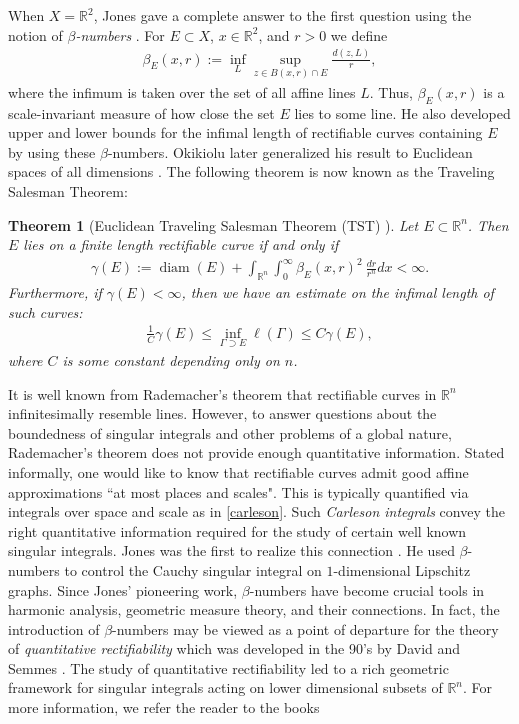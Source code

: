 \documentclass[11pt]{amsart}
\newtheorem{theorem}{Theorem}
\def\diam{{\rm diam\,}}
\theoremstyle{definition}
\newcommand{\R}{\mathbb R}
\def\diam{\operatorname{diam}}
\numberwithin{theorem}{section} \numberwithin{equation}{section}
\begin{document}
When $X = \R^2$, Jones gave a complete answer to the first question using the notion of {\em $\beta$-numbers} \cite{JonesTSP}.  For $E \subset X$,  $x \in \R^2$, and $r > 0$ we define
\begin{align*}
  \beta_E(x,r) := \inf_L \sup_{z \in B(x,r) \cap E} \frac{d(z,L)}{r},
\end{align*}
where the infimum is taken over the set of all affine lines $L$.  Thus, $\beta_E(x,r)$ is a scale-invariant measure of how close the set $E$ lies to some line.  He also developed upper and lower bounds for the infimal length of rectifiable curves containing $E$ by using these $\beta$-numbers.  Okikiolu later generalized his result to Euclidean spaces of all dimensions \cite{Okikiolu}.  The following theorem is now known as the Traveling Salesman Theorem:
\begin{theorem}[Euclidean Traveling Salesman Theorem (TST) \cite{JonesTSP,Okikiolu}]
\label{etst}
  Let $E \subset \R^n$.  Then $E$ lies on a finite length rectifiable curve if and only if %
  \begin{align} \label{carleson}
    \gamma(E) := \diam(E) + \int_{\R^n} \int_0^\infty \beta_E(x,r)^2 ~\frac{dr}{r^n} dx < \infty.
  \end{align}
  Furthermore, if $\gamma(E) < \infty$, then we have an estimate on the infimal length of such curves:
  \begin{align*}
    \frac{1}{C} \gamma(E) \leq \inf_{\Gamma \supset E} \ell(\Gamma) \leq C \gamma(E),
  \end{align*}
  where $C$ is some constant depending only on $n$.
\end{theorem}
It is well known from Rademacher's theorem that rectifiable curves in $\mathbb{R}^n$ infinitesimally resemble lines. 
However, to answer questions about the boundedness of singular integrals and other problems of a global nature, 
Rademacher's theorem does not provide enough quantitative information. 
Stated informally, one would like to know that rectifiable curves admit good affine approximations ``at most places and scales". 
This is typically quantified via integrals over space and scale as in \eqref{carleson}. 
Such {\em Carleson integrals} convey the right quantitative information required for the study of certain well known singular integrals. 
Jones was the first to realize this connection \cite{jo1}. 
He used $\beta$-numbers to control the Cauchy singular integral on $1$-dimensional Lipschitz graphs. 
Since Jones' pioneering work, $\beta$-numbers have become crucial tools in harmonic analysis, geometric measure theory, and their connections. 
In fact, the introduction of $\beta$-numbers may be viewed as a point of departure for the theory of {\em quantitative rectifiability} which was developed in the 90's by David and Semmes \cite{DS1,DS2, DS3}. 
The study of quantitative rectifiability  led to a rich geometric framework for singular integrals acting on lower dimensional subsets of $\R^n$. For more information, we refer the reader to the books \cite{DS2,pajotbook,tolsabook}
\end{document}
